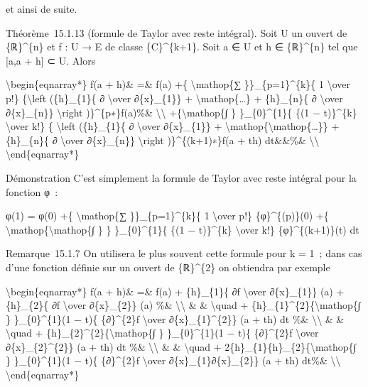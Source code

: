 \documentclass[]{article}
\begin{document}
et ainsi de suite.

Théorème~15.1.13 (formule de Taylor avec reste intégral). Soit U un
ouvert de \{ℝ\}\^{}\{n\} et f : U → E de classe \{C\}\^{}\{k+1\}. Soit a
∈ U et h ∈ \{ℝ\}\^{}\{n\} tel que {[}a,a + h{]} ⊂ U. Alors

\textbackslash{}begin\{eqnarray*\} f(a + h)\& =\& f(a) +\{
\textbackslash{}mathop\{∑ \}\}\_\{p=1\}\^{}\{k\}\{ 1
\textbackslash{}over p!\} \{\textbackslash{}left (\{h\}\_\{1\}\{ ∂
\textbackslash{}over ∂\{x\}\_\{1\}\} +
\textbackslash{}mathop\{\ldots{}\} + \{h\}\_\{n\}\{ ∂
\textbackslash{}over ∂\{x\}\_\{n\}\} \textbackslash{}right
)\}\^{}\{p∗\}f(a)\%\& \textbackslash{}\textbackslash{}
+\{\textbackslash{}mathop\{∫ \} \}\_\{0\}\^{}\{1\}\{ \{(1 −
t)\}\^{}\{k\} \textbackslash{}over k!\} \{ \textbackslash{}left
(\{h\}\_\{1\}\{ ∂ \textbackslash{}over ∂\{x\}\_\{1\}\} +
\textbackslash{}mathop\{\textbackslash{}mathop\{\ldots{}\}\} +
\{h\}\_\{n\}\{ ∂ \textbackslash{}over ∂\{x\}\_\{n\}\}
\textbackslash{}right )\}\^{}\{(k+1)∗\}f(a + th) dt\&\&\%\&
\textbackslash{}\textbackslash{} \textbackslash{}end\{eqnarray*\}

Démonstration C'est simplement la formule de Taylor avec reste intégral
pour la fonction φ~:

φ(1) = φ(0) +\{ \textbackslash{}mathop\{∑ \}\}\_\{p=1\}\^{}\{k\}\{ 1
\textbackslash{}over p!\} \{φ\}\^{}\{(p)\}(0) +\{
\textbackslash{}mathop\{\textbackslash{}mathop\{∫ \} \}
\}\_\{0\}\^{}\{1\}\{ \{(1 − t)\}\^{}\{k\} \textbackslash{}over k!\}
\{φ\}\^{}\{(k+1)\}(t) dt

Remarque~15.1.7 On utilisera le plus souvent cette formule pour k = 1~;
dans cas d'une fonction définie sur un ouvert de \{ℝ\}\^{}\{2\} on
obtiendra par exemple

\textbackslash{}begin\{eqnarray*\} f(a + h)\& =\& f(a) + \{h\}\_\{1\}\{
∂f \textbackslash{}over ∂\{x\}\_\{1\}\} (a) + \{h\}\_\{2\}\{ ∂f
\textbackslash{}over ∂\{x\}\_\{2\}\} (a) \%\&
\textbackslash{}\textbackslash{} \& \& \textbackslash{}quad +
\{h\}\_\{1\}\^{}\{2\}\{\textbackslash{}mathop\{∫ \} \}\_\{0\}\^{}\{1\}(1
− t)\{ \{∂\}\^{}\{2\}f \textbackslash{}over ∂\{x\}\_\{1\}\^{}\{2\}\} (a
+ th) dt \%\& \textbackslash{}\textbackslash{} \& \&
\textbackslash{}quad + \{h\}\_\{2\}\^{}\{2\}\{\textbackslash{}mathop\{∫
\} \}\_\{0\}\^{}\{1\}(1 − t)\{ \{∂\}\^{}\{2\}f \textbackslash{}over
∂\{x\}\_\{2\}\^{}\{2\}\} (a + th) dt \%\&
\textbackslash{}\textbackslash{} \& \& \textbackslash{}quad +
2\{h\}\_\{1\}\{h\}\_\{2\}\{\textbackslash{}mathop\{∫ \}
\}\_\{0\}\^{}\{1\}(1 − t)\{ \{∂\}\^{}\{2\}f \textbackslash{}over
∂\{x\}\_\{1\}∂\{x\}\_\{2\}\} (a + th) dt\%\&
\textbackslash{}\textbackslash{} \textbackslash{}end\{eqnarray*\}
\end{document}
